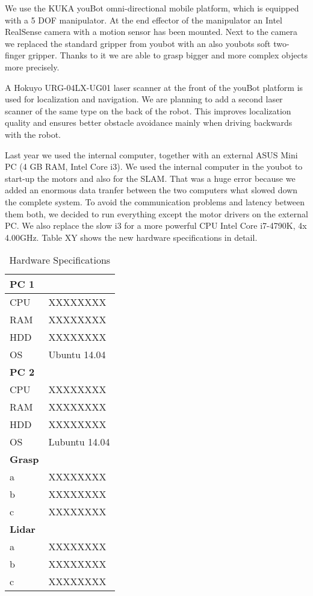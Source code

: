 We use the KUKA youBot omni-directional mobile platform, which is equipped with a 5 DOF manipulator. At the end effector of the manipulator an Intel RealSense camera with a motion sensor has been mounted. Next to the camera we replaced the standard gripper from youbot with an also youbots soft two-finger gripper. Thanks to it we are able to grasp bigger and more complex objects more precisely.

A Hokuyo URG-04LX-UG01 laser scanner at the front of the youBot platform is used for localization and navigation. We are planning to add a second laser scanner of the same type on the back of the robot. This improves localization quality and ensures better obstacle avoidance mainly when driving backwards with the robot.

Last year we used the internal computer, together with an external ASUS Mini PC (4 GB RAM, Intel Core i3). We used the internal computer in the youbot to start-up the motors and also for the SLAM. That was a huge error because we added an enormous data tranfer between the two computers what slowed down the complete system. To avoid the communication problems and latency between them both, we decided to run everything except the motor drivers on the external PC. We also replace the slow i3 for a more powerful CPU Intel Core i7-4790K, 4x 4.00GHz. Table XY  shows the new hardware specifications in detail.

\begin{table}[h]
	\caption{Hardware Specifications}
	\centering
	\begin{tabular}{ | p{2cm} | p{3cm} | }
		\hline
		\bfseries{PC 1} &  \\
		\hline
		CPU & XXXXXXXX \\
		RAM & XXXXXXXX \\
		HDD & XXXXXXXX \\
		OS & Ubuntu 14.04 \\
		\hline \hline
		\bfseries{PC 2} &  \\
		\hline
		CPU & XXXXXXXX \\
		RAM & XXXXXXXX \\
		HDD & XXXXXXXX \\
		OS & Lubuntu 14.04 \\
		\hline \hline
		\bfseries{Grasp} &  \\
		\hline
		a & XXXXXXXX \\
		b & XXXXXXXX \\
		c & XXXXXXXX \\
		\hline \hline
		\bfseries{Lidar} &  \\
		\hline
		a & XXXXXXXX \\
		b & XXXXXXXX \\
		c & XXXXXXXX \\
		\hline
	\end{tabular}
	\label{tab:hw}
\end{table}

